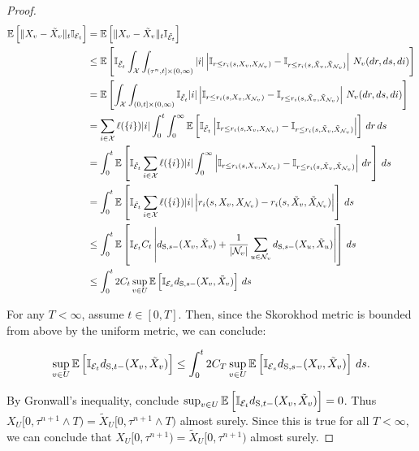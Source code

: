 \documentclass[12pt]{article}
\newcommand{\mb}{\mathbb}
\newcommand{\mc}{\mathcal}
\newcommand{\te}{\text}
\newcommand{\ex}[1]{\mb{E}\left[#1\right]}			%
\newcommand{\sta}{\mc{X}}							%
\newcommand{\neigh}[1]{\mc{N}_{#1}}					%
\newcommand{\indx}[1]{^{#1}}						%
\newcommand{\Xf}{X}									%
\newcommand{\poiss}{N}								%
\newcommand{\Sm}{\ell}								%
\newcommand{\rate}{r}								%
\newcommand{\stmet}[1]{
\ifstrempty{#1}{
	d_{\te{S}}}{
	d_{\te{S},#1}}}									%
\newcommand{\poissv}[1]{_{#1}}						%
\newcommand{\vind}[1]{_{#1}}						%
\newcommand{\tmi}[1]{#1}							%
\newcommand{\stpara}[1]{_{#1}}						%
\newcommand{\tpara}[1]{_{#1}}						%
\newcommand{\jumpbd}[1]{C_{#1}}						%
\newcommand{\tmepro}[3]{
\ifstrempty{#3}{
	(#1,#2)}{
	(#1,#2,#3)}}									%
\newcommand{\alt}[1]{\tilde{#1}}					%
\newcommand{\rt}{\tau}								%
\newcommand{\seto}{U}								%
\newcommand{\evnt}{\mc{E}}						%
\newcommand{\indo}{n}							%
\begin{document}
\begin{proof}
\begin{align*}
\ex{\|\Xf\vind{v} - \alt{\Xf}\vind{v}\|\tpara{t}\mb{I}_{\evnt\tpara{t}}} &=\ex{\|\Xf\vind{v} - \alt{\Xf}\vind{v}\|\tpara{t}\mb{I}_{\alt{\evnt}\tpara{t}}}\\
&\leq \ex{\mb{I}_{\alt{\evnt}\tpara{t}}\int_\sta\int_{(\rt\indx{\indo},t]\times (0,\infty)} |i|\left|\mb{I}_{r \leq \rate\stpara{i}\tmepro{s}{\Xf\vind{v}}{\Xf\vind{\neigh{v}}}} - \mb{I}_{r \leq \rate\stpara{i}\tmepro{s}{\alt{\Xf}\vind{v}}{\alt{\Xf}\vind{\neigh{v}}}}\right|\,\poiss\poissv{v}(dr,ds,di)}\\
&=\ex{\int_\sta\int_{(0,t]\times (0,\infty)} \mb{I}_{\alt{\evnt}\tpara{t}}|i|\left|\mb{I}_{r \leq \rate\stpara{i}\tmepro{s}{\Xf\vind{v}}{\Xf\vind{\neigh{v}}}} - \mb{I}_{r \leq \rate\stpara{i}\tmepro{s}{\alt{\Xf}\vind{v}}{\alt{\Xf}\vind{\neigh{v}}}}\right|\,\poiss\poissv{v}(dr,ds,di)}\\
&= \sum_{i \in \sta}\Sm(\{i\})|i|\int_0^t\int_0^\infty \ex{\mb{I}_{\alt{\evnt}\tpara{t}}\left|\mb{I}_{r \leq \rate\stpara{i}\tmepro{s}{\Xf\vind{v}}{\Xf\vind{\neigh{v}}}} - \mb{I}_{r \leq \rate\stpara{i}\tmepro{s}{\alt{\Xf}\vind{v}}{\alt{\Xf}\vind{\neigh{v}}}}\right|}\,dr\,ds\\
&= \int_0^t\ex{\mb{I}_{\alt{\evnt}\tpara{t}}\sum_{i \in \sta}\Sm(\{i\})|i|\int_0^\infty\left|\mb{I}_{r \leq \rate\stpara{i}\tmepro{s}{\Xf\vind{v}}{\Xf\vind{\neigh{v}}}} - \mb{I}_{r \leq \rate\stpara{i}\tmepro{s}{\alt{\Xf}\vind{v}}{\alt{\Xf}\vind{\neigh{v}}}}\right|\,dr}\,ds\\
&= \int_0^t\ex{\mb{I}_{\alt{\evnt}\tpara{t}}\sum_{i \in \sta}\Sm(\{i\})|i|\left|\rate\stpara{i}\tmepro{s}{\Xf\vind{v}}{\Xf\vind{\neigh{v}}} - \rate\stpara{i}\tmepro{s}{\alt{\Xf}\vind{v}}{\alt{\Xf}\vind{\neigh{v}}}\right|}\,ds\\
&\leq\int_0^t\ex{\mb{I}_{\evnt\tpara{t}}\jumpbd{t}\left|\stmet{s-}(\Xf\vind{v},\alt{\Xf}\vind{v}) + \frac{1}{|\neigh{v}|}\sum_{u \in \neigh{v}} \stmet{s-}(\Xf\vind{u},\alt{\Xf}\vind{u})\right|}\,ds\\
&\leq \int_0^t2\jumpbd{t} \sup_{v \in \seto}\ex{\mb{I}_{\evnt\tpara{s}}\stmet{s-}(\Xf\vind{v},\alt{\Xf}\vind{v})}\,ds
\end{align*}

For any \(T < \infty\), assume \(t \in [0,T]\). Then, since the Skorokhod metric is bounded from above by the uniform metric, we can conclude:

\[\sup_{v \in \seto}\ex{\mb{I}_{\evnt\tpara{t}}\stmet{t-}(\Xf\vind{v},\alt{\Xf}\vind{v})} \leq \int_0^t 2\jumpbd{T}\sup_{v \in \seto}\ex{\mb{I}_{\evnt\tpara{s}}\stmet{s-}(\Xf\vind{v},\alt{\Xf}\vind{v})}\,ds.\]

By Gronwall's inequality, conclude \(\sup_{v \in \seto}\ex{\mb{I}_{\evnt\tpara{t}}\stmet{t-}(\Xf\vind{v},\alt{\Xf}\vind{v})} = 0\). Thus \(\Xf\vind{\seto}\tmi{[0,\rt\indx{\indo+1}\wedge T)} = \alt{\Xf}\vind{\seto}\tmi{[0,\rt\indx{\indo+1}\wedge T)}\) almost surely. Since this is true for all \(T < \infty\), we can conclude that \(\Xf\vind{\seto}\tmi{[0,\rt\indx{\indo+1})} = \alt{\Xf}\vind{\seto}\tmi{[0,\rt\indx{\indo+1})}\) almost surely.
\end{proof}
\end{document}
